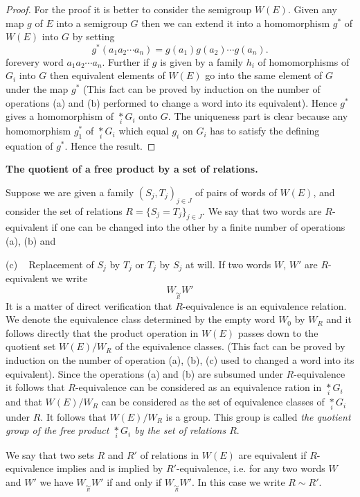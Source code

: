 \begin{proof}
For the proof it is better to consider the semigroup $W(E)$. Given any
map $g$ of $E$ into a semigroup $G$ then we can extend it into a
homomorphism $g^\ast$ of $W(E)$ into $G$ by setting  
$$
g^\ast (a_1 a_2 \cdots a_n)=g(a_1)g(a_2)\cdots g(a_n).
$$
for\pageoriginale every word $a_1a_2 \cdots a_n$. Further if $g$ is
given by a 
family $h_i$ of homomorphisms of $G_i$ into $G$ then equivalent
elements of $W(E)$ go into the same element of $G$ under the map $g^\ast$
(This fact can be proved by induction on the number of operations (a)
and (b) performed to change a word into its equivalent). Hence $g^\ast$
gives a homomorphism of $\underset{i}{\ast} G_i$ onto $G$. The uniqueness
part is clear because any homomorphism $g^\ast_1$ of $\underset{i}{\ast} G_i$
which equal $g_i$ on $G_i$ has to satisfy the defining equation of
$g^\ast$. Hence the result. 
\end{proof}

\medskip
\noindent
\textbf{The quotient of a free product by a set of relations.}

Suppose we are given a family $(S_j,T_j)_{j \in J}$ of pairs of words
of $W(E)$, and consider the set of relations $R=\{ S_j=T_j \}_{j \in
  J}$. We say that two words are $R$-equivalent if one can be changed
into the other by a finite number of operations (a), (b) and 

(c) ~ Replacement of $S_j$ by $T_j$ or $T_j$ by $S_j$ at will. If two
words $W$, $W'$ are $R$-equivalent we write 
$$ 
W_{\underset{R}{\sim}} W'
$$
It is a matter of direct verification that $R$-equivalence is an
equivalence relation. We denote the equivalence class determined by
the empty word $W_0$ by $W_R$ and it follows directly that the product
operation in $W(E)$ passes down to the quotient set $W(E)/ W_R$ of the
equivalence classes. (This fact can be proved by\pageoriginale
induction on the 
number of operation (a), (b), (c) used to changed a word into its
equivalent). Since the operations (a) and (b) are subsumed under
$R$-equivalence it follows that $R$-equivalence can be considered as an
equivalence ration in $\underset{i}{\ast} G_i$ and that $W(E)/W_R$ can be
considered as the set of equivalence classes of $\underset{i}{\ast} G_i$
under $R$. It follows that $W(E)/W_R$ is a group. This group is called
\textit{the quotient group of the free product $\underset{i}{\ast} G_i$ by
  the set of relations $R$}. 

We say that two sets $R$ and $R'$ of relations in $W(E)$ are
equivalent if $R$-equivalence implies and is implied by $R'$-equivalence,
i.e. for any two words $W$ and $W'$ we have $W_{\underset R {\sim}
}W'$ if and only if $W_{\underset R  \sim }W'$. In this case we write
$R \sim R'$. 

